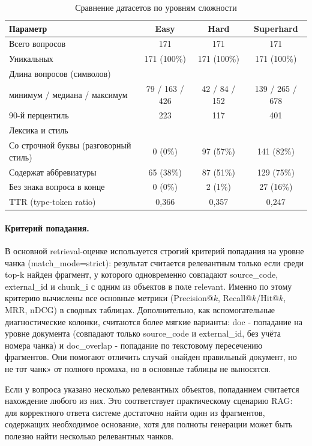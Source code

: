 \documentclass[a4paper,12pt]{article}
\begin{document}
\begin{table}[H]
\centering
\caption{Сравнение датасетов по уровням сложности}
\label{tab:dataset_stats}
\renewcommand{\arraystretch}{1.1}
\begin{tabular}{|l|c|c|c|}
\hline
\textbf{Параметр} & \textbf{Easy} & \textbf{Hard} & \textbf{Superhard} \\
\hline
Всего вопросов & 171 & 171 & 171 \\
Уникальных & 171 (100\%) & 171 (100\%) & 171 (100\%) \\
\hline
\multicolumn{4}{l}{Длина вопросов (символов)} \\
минимум / медиана / максимум & 79 / 163 / 426 & 42 / 84 / 152 & 139 / 265 / 678 \\
90-й перцентиль & 223 & 117 & 401 \\
\hline
\multicolumn{4}{l}{Лексика и стиль} \\
Со строчной буквы (разговорный стиль) & 0 (0\%) & 97 (57\%) & 141 (82\%) \\
Содержат аббревиатуры & 65 (38\%) & 87 (51\%) & 129 (75\%) \\
Без знака вопроса в конце & 0 (0\%) & 2 (1\%) & 27 (16\%) \\
TTR (type-token ratio) & 0,366 & 0,357 & 0,247 \\
\hline
\end{tabular}
\end{table}
\FloatBarrier

\paragraph{Критерий попадания.}

В основной retrieval-оценке используется строгий критерий попадания на уровне чанка (match\_mode=strict): результат считается релевантным только если среди top-k найден фрагмент, у которого одновременно совпадают source\_code, external\_id и chunk\_i с одним из объектов в поле relevant. Именно по этому критерию вычислены все основные метрики (Precision@$k$, Recall@$k$/Hit@$k$, MRR, nDCG) в сводных таблицах. Дополнительно, как вспомогательные диагностические колонки, считаются более мягкие варианты: doc - попадание на уровне документа (совпадают только source\_code и external\_id, без учёта номера чанка) и doc\_overlap - попадание по текстовому пересечению фрагментов. Они помогают отличить случай «найден правильный документ, но не тот чанк» от полного промаха, но в основные таблицы не выносятся.

Если у вопроса указано несколько релевантных объектов, попаданием считается нахождение любого из них. Это соответствует практическому сценарию RAG: для корректного ответа системе достаточно найти один из фрагментов, содержащих необходимое основание, хотя для полноты генерации может быть полезно найти несколько релевантных чанков.
\end{document}
